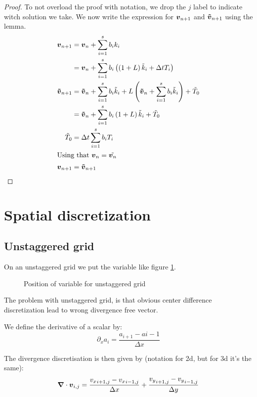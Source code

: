 \begin{proof}
To not overload the proof with notation, we drop the $j$ label to indicate witch solution we take.
We now write the expression for ${\boldsymbol {v}}_{n+1}$ and ${\boldsymbol {\tilde{v}}}_{n+1}$ using the lemma.
\begin{align*}
{\boldsymbol {v}}_{n+1}&={\boldsymbol {v}}_{n}+\sum_{i=1}^{s}b_{i}k_{i}\\
&={\boldsymbol {v}}_{n}+\sum_{i=1}^{s}b_{i}\left(\left(1+L\right)\tilde{k}_i+\Delta t T_{i}\right)\\
{\boldsymbol {\tilde{v}}}_{n+1}&={\boldsymbol {\tilde{v}}}_{n}+\sum_{i=1}^{s}b_{i}\tilde{k}_{i}+L\left({\boldsymbol {\tilde{v}}}_{n}+\sum_{i=1}^{s}b_{i}\tilde{k}_{i}\right)+\tilde{T}_0\\
&={\boldsymbol {\tilde{v}}}_{n}+\sum_{i=1}^{s}b_{i}\left(1+L\right)\tilde{k}_{i}+\tilde{T}_0\\
\tilde{T}_0&=\Delta t\sum_{i=1}^{s}b_{i}T_{i}\\
\intertext{Using that ${\boldsymbol {v}}_{n}=\tilde{{\boldsymbol {v}}_{n}}$}
{\boldsymbol {v}}_{n+1}&={\boldsymbol {\tilde{v}}}_{n+1}
\end{align*}

\end{proof}

\section{Spatial discretization}

\subsection{Unstaggered grid}

On an unstaggered grid we put the variable like figure \ref{fixed:unstaggered}.

\begin{figure}
\caption{Position of variable for unstaggered grid}
\label{fixed:unstaggered}
\end{figure}

The problem with unstaggered grid, is that obvious center difference discretization lead to wrong divergence free vector.

We define the derivative of a scalar by:
\begin{equation}
  \partial_x a_i=\frac{a_{i+1}-a{i-1}}{\Delta x}
\end{equation}

The divergence discretisation is then given by (notation for 2d, but for 3d it's the same):
\begin{equation}
  {\boldsymbol {\nabla}} \cdot {\boldsymbol {v}}_{i,j}=\frac{{v_{x}}_{i+1,j}-{v_{x}}_{i-1,j}}{\Delta x}+\frac{{v_{y}}_{i+1,j}-{v_{y}}_{i-1,j}}{\Delta y}
\end{equation}

